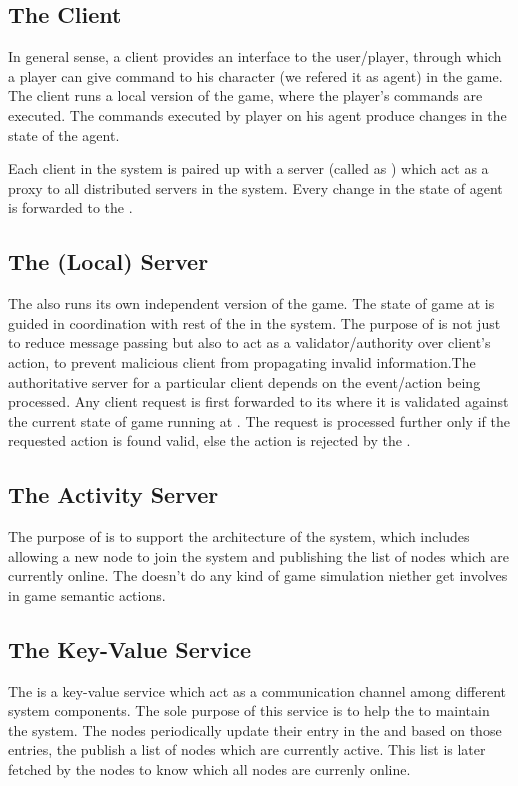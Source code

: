 \subsection{The Client}

	In general sense, a client provides an interface to the user/player, through which a player can give command to his character (we refered it as agent) in the game. The client runs a local version of the game, where the player's commands are executed. The commands executed by player on his agent produce changes in the state of the agent. 
	
	Each client in the system is paired up with a server (called as \localServer) which act as a proxy to all distributed servers in the system. Every change in the state of agent is forwarded to the \localServer. 
	
\subsection{The (Local) Server}

	The \localServer also runs its own independent version of the game. The state of game at \localServer is guided in coordination with rest of the \localServers in the system. The purpose of \localServer is not just to reduce message passing but also to act as a validator/authority over client's action, to prevent malicious client from propagating invalid information.The authoritative server for a particular client depends on the event/action being processed. Any client request is first forwarded to its \localServer where it is validated against the current state of game running at \localServer. The request is processed further only if the requested action is found valid, else the action is rejected by the \localServer. 
	
\subsection{The Activity Server}
	The purpose of \activityServer is to support the architecture of the system, which includes allowing a new node to join the system and publishing the list of nodes which are currently online. The \activityServer doesn't do any kind of game simulation niether get involves in game semantic actions.

\subsection{The Key-Value Service}
	The \kvService is a key-value service which act as a communication channel among different system components. The sole purpose of this service is to help the \activityServer to maintain the system. The nodes periodically update their entry in the \kvService and based on those entries, the \activityServer publish a list of nodes which are currently active. This list is later fetched by the nodes to know which all nodes are currenly online.

